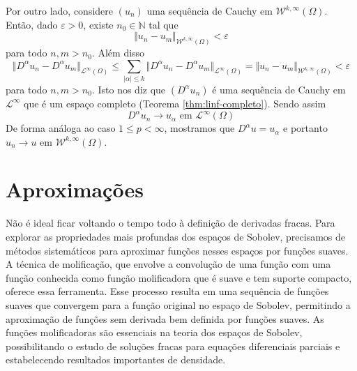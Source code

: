 \documentclass[a4paper, 11pt]{book}
\theoremstyle{definition}
\newcommand{\bN}{\mathbb{N}}
\newcommand{\cL}{\mathcal{L}}
\newcommand{\cW}{\mathcal{W}}
\begin{document}
\begin{prf}
    Por outro lado, considere $(u_n)$ uma sequência de Cauchy em $\cW^{k,\infty}(\Omega)$. Então, dado $\varepsilon > 0$, existe $n_0 \in \bN$ tal que
    \[
        \Vert u_n - u_m \Vert_{\cW^{k,\infty}(\Omega)} < \varepsilon
    \]
    para todo $n,m > n_0$. Além disso
    \[
        \Vert D^\alpha u_n - D^\alpha u_m \Vert_{\cL^\infty(\Omega)} \leqslant \sum_{|\alpha| \leqslant k} \Vert D^\alpha u_n - D^\alpha u_m \Vert_{\cL^\infty(\Omega)} = \Vert u_n - u_m \Vert_{\cW^{k,\infty}(\Omega)} < \varepsilon
    \]
    para todo $n,m > n_0$. Isto nos diz que $(D^\alpha u_n)$ é uma sequência de Cauchy em $\cL^\infty$ que é um espaço completo (Teorema \ref{thm:linf-completo}). Sendo assim
    \[
        D^{\alpha} u_n \to u_\alpha \text{ em } \cL^\infty(\Omega)
    \]
    De forma análoga ao caso $1 \leqslant p < \infty$, mostramos que $D^\alpha u = u_\alpha$ e portanto $u_n \to u$ em $\cW^{k,\infty}(\Omega)$.
\end{prf}

\section{Aproximações}

Não é ideal ficar voltando o tempo todo à definição de derivadas fracas. Para explorar as propriedades mais profundas dos espaços de Sobolev, precisamos de métodos sistemáticos para aproximar funções nesses espaços por funções suaves. A técnica de molificação, que envolve a convolução de uma função com uma função conhecida como função molificadora que é suave e tem suporte compacto, oferece essa ferramenta. Esse processo resulta em uma sequência de funções suaves que convergem para a função original no espaço de Sobolev, permitindo a aproximação de funções sem derivada bem definida por funções suaves. As funções molificadoras são essenciais na teoria dos espaços de Sobolev, possibilitando o estudo de soluções fracas para equações diferenciais parciais e estabelecendo resultados importantes de densidade.
\end{document}
